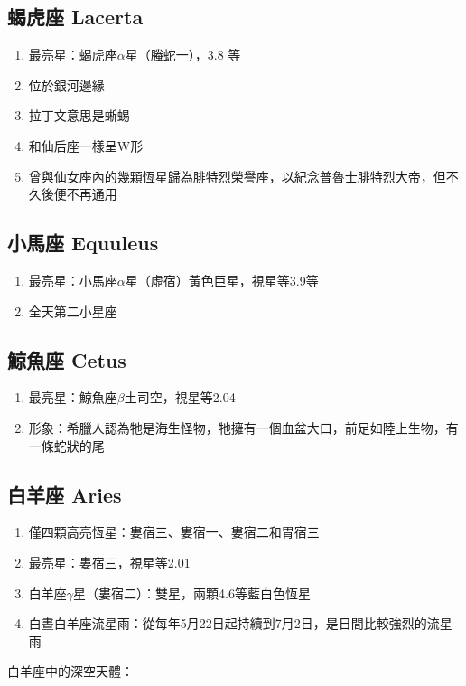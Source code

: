 \subsection{蝎虎座 Lacerta}
\begin{enumerate}
    \item 最亮星：蝎虎座\(\alpha\)星（螣蛇一），3.8 等
    \item 位於銀河邊緣
    \item 拉丁文意思是蜥蜴
    \item 和仙后座一樣呈W形
    \item 曾與仙女座內的幾顆恆星歸為腓特烈榮譽座，以紀念普魯士腓特烈大帝，但不久後便不再通用
\end{enumerate}

\subsection{小馬座 Equuleus}
\begin{enumerate}
    \item 最亮星：小馬座\(\alpha\)星（虛宿）黃色巨星，視星等3.9等
    \item 全天第二小星座
\end{enumerate}

\subsection{鯨魚座 Cetus}
\begin{enumerate}
    \item 最亮星：鯨魚座\(\beta\)土司空，視星等2.04
    \item 形象：希臘人認為牠是海生怪物，牠擁有一個血盆大口，前足如陸上生物，有一條蛇狀的尾
\end{enumerate}

\subsection{白羊座 Aries}
\begin{enumerate}
    \item 僅四顆高亮恆星：婁宿三、婁宿一、婁宿二和胃宿三
    \item 最亮星：婁宿三，視星等2.01
    \item 白羊座\(\gamma\)星（婁宿二）：雙星，兩顆4.6等藍白色恆星
    \item 白晝白羊座流星雨：從每年5月22日起持續到7月2日，是日間比較強烈的流星雨
\end{enumerate}
白羊座中的深空天體：

